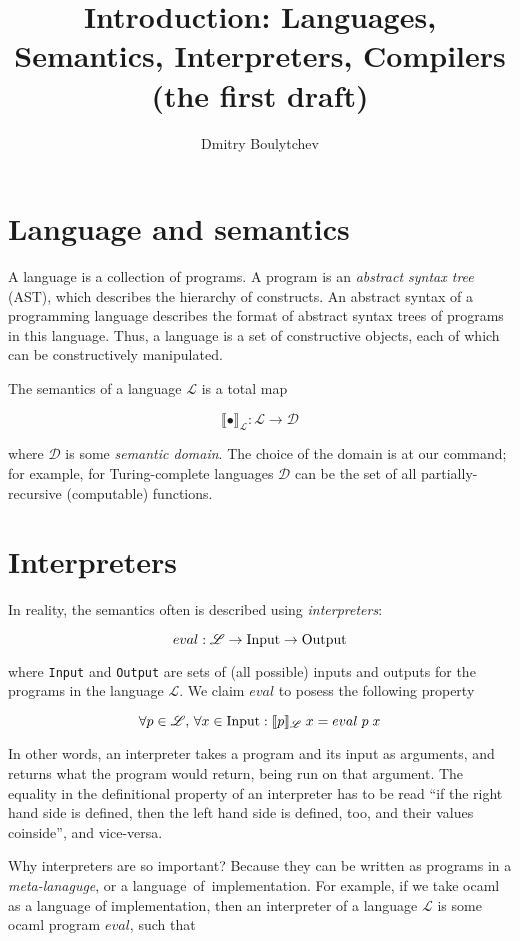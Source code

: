 \documentclass{article}
\title{Introduction: Languages, Semantics, Interpreters, Compilers\\
  (the first draft)
}
\author{Dmitry Boulytchev}
\newcommand{\sembr}[1]{\llbracket{#1}\rrbracket}
\theoremstyle{definition}
\begin{document}
\maketitle

\section{Language and semantics}

A language is a collection of programs. A program is an \emph{abstract syntax tree} (AST), which describes the hierarchy of constructs. An abstract
syntax of a programming language describes the format of abstract syntax trees of programs in this language. Thus, a language is a set of constructive
objects, each of which can be constructively manipulated.

The semantics of a language $\mathscr L$ is a total map

$$
\sembr{\bullet}_{\mathscr L} : \mathscr L \to \mathscr D
$$

where $\mathscr D$ is some \emph{semantic domain}. The choice of the domain is at our command; for example, for Turing-complete languages $\mathscr D$ can
be the set of all partially-recursive (computable) functions.

\section{Interpreters}

In reality, the semantics often is described using \emph{interpreters}:

$$
eval : \mathscr L \to \mbox{\lstinline|Input|} \to \mbox{\lstinline|Output|}
$$

where \lstinline|Input| and \lstinline|Output| are sets of (all possible) inputs and outputs for the programs in the language $\mathscr L$. We claim $eval$ to
posess the following property

$$
\forall p \in \mathscr L,\, \forall x\in \mbox{\lstinline|Input|} : \sembr{p}_{\mathscr L}\;x = eval\; p\; x
$$

In other words, an interpreter takes a program and its input as arguments, and returns what the program would return, being run on that
argument. The equality in the definitional property of an interpreter has to be read ``if the right hand side is defined, then the left hand side
is defined, too, and their values coinside'', and vice-versa.

Why interpreters are so important? Because they can be written as programs in a \emph{meta-lanaguge}, or a \mbox{language of implementation}. For example,
if we take ocaml as a language of implementation, then an interpreter of a language $\mathscr L$ is some ocaml program $eval$, such that
\end{document}
